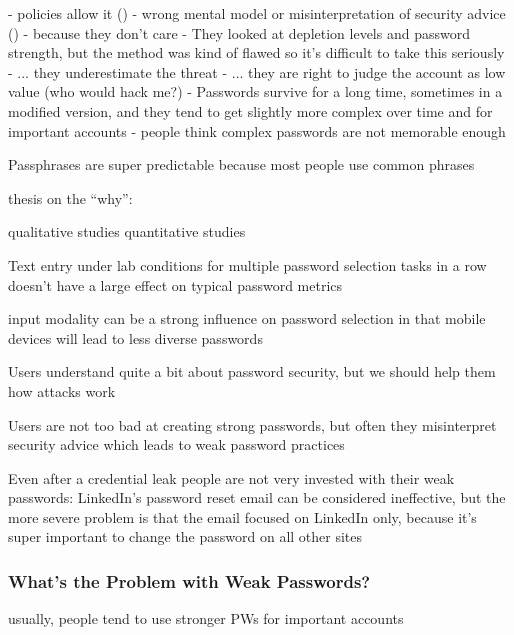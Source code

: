 	- policies allow it (\cite{Seitz2017PoliciesReuse})
	- wrong mental model or misinterpretation of security advice (\cite{Ur2015PWCreationLab, Ur2016PerceptionsPassword, Seitz2017PASDJO})
	- because they don't care
	- They looked at depletion levels and password strength, but the method was kind of flawed so it's difficult to take this seriously \cite{Gross2016EffectCognitiveEffort}
	- ... they underestimate the threat
	- ... they are right to judge the account as low value (who would hack me?) \cite{LastPass2016PersonalitiesGetUsHacked}
	- Passwords survive for a long time, sometimes in a modified version, and they tend to get slightly more complex over time and for important accounts\cite{VonZezschwitz2013SurvivalShortest}
	- people think complex passwords are not memorable enough \cite{Woods2018TooManyPasswords}
	
	Passphrases are super predictable because most people use common phrases \cite{Bonneau2012LinguisticProperties}
	
	\cite{Wang2015ChinesePWs}
	
	thesis on the ``why'': \cite{Notoatmodjo2007ExploringWeakestLink}
	
	qualitative studies \cite{Ur2015PWCreationLab, Stobert2014PasswordLifeCycle} 
	quantitative studies \cite{Ur2016PerceptionsPassword, Seitz2017PASDJO}
	
	
	Text entry under lab conditions for multiple password selection tasks in a row doesn't have a large effect on typical password metrics \cite{Yang2014EntryAffectsPasswordSecurity}
	
	input modality can be a strong influence on password selection in that mobile devices will lead to less diverse passwords \cite{VonZezschwitz2014HoneyIShrunkTheKeys}
	
	Users understand quite a bit about password security, but we should help them how attacks work \cite{Ur2016PerceptionsPassword}
	
	
	Users are not too bad at creating strong passwords, but often they misinterpret security advice which leads to weak password practices \cite{Ur2015PWCreationLab}
	
	Even after a credential leak people are not very invested with their weak passwords: LinkedIn's password reset email can be considered ineffective, but the more severe problem is that the email focused on LinkedIn only, because it's super important to change the password on all other sites \cite{Huh2017TooBusy}
	
	\subsubsection{What's the Problem with Weak Passwords?}
	usually, people tend to use stronger PWs for important accounts
	
